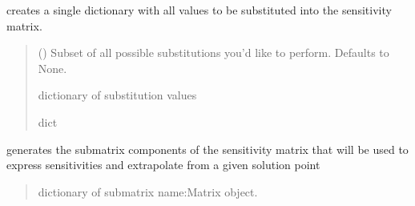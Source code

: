 \documentclass[letterpaper,10pt,english]{sphinxmanual}
\begin{document}
\begin{fulllineitems}
\label{\detokenize{src.sensitivity.sensitivity_tools:src.sensitivity.sensitivity_tools.SensitivityMatrix}}
\pysigstartsignatures
\pysiglinewithargsret
{}
{\sphinxparamcomma {}\sphinxparamcomma {}}
{}
\pysigstopsignatures{}

\begin{fulllineitems}
\label{\detokenize{src.sensitivity.sensitivity_tools:src.sensitivity.sensitivity_tools.SensitivityMatrix.create_substitution_dictionary}}
\pysigstartsignatures
\pysiglinewithargsret
{}
{}
{}
\pysigstopsignatures
\sphinxAtStartPar
creates a single dictionary with all values to be substituted into the sensitivity matrix.
\begin{quote}\begin{description}
\sphinxAtStartPar
{} (\sphinxstyleliteralemphasis{\sphinxupquote{, }}) \textendash{} Subset of all possible substitutions you’d like to perform. Defaults to None.

\sphinxAtStartPar
dictionary of substitution values

\sphinxAtStartPar
dict

\end{description}\end{quote}

\end{fulllineitems}


\begin{fulllineitems}
\label{\detokenize{src.sensitivity.sensitivity_tools:src.sensitivity.sensitivity_tools.SensitivityMatrix.generate_matrix}}
\pysigstartsignatures
\pysiglinewithargsret
{}
{}
{}
\pysigstopsignatures
\sphinxAtStartPar
generates the submatrix components of the sensitivity matrix that will be used to express sensitivities and extrapolate from a given solution point
\begin{quote}\begin{description}
\sphinxAtStartPar
dictionary of submatrix name:Matrix object.


\end{description}
\end{quote}
\end{fulllineitems}
\end{fulllineitems}
\end{document}
